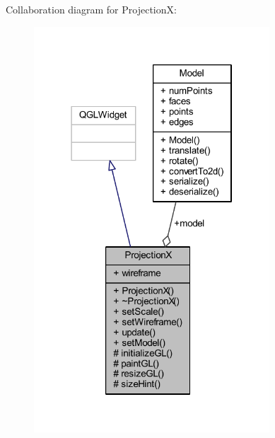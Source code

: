 Collaboration diagram for ProjectionX\+:\nopagebreak
\begin{figure}[H]
\begin{center}
\leavevmode
\includegraphics[width=250pt]{class_projection_x__coll__graph}
\end{center}
\end{figure}
